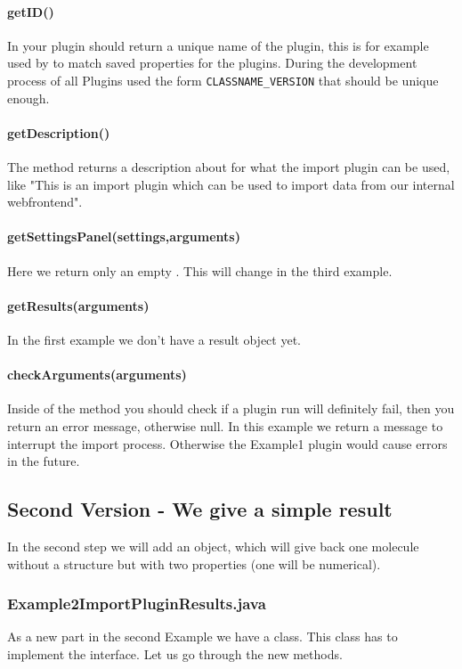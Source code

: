\paragraph{getID()}
In  your plugin should return a unique name of the plugin, this is for example used by \sh to match saved properties for the plugins. During the development process of \sh all Plugins used the form      \verb+CLASSNAME_VERSION+ that should be unique enough.

\paragraph{getDescription()}
The  method returns a description about for what the import plugin can be used, like "This is an import plugin which can be used to import data from our internal webfrontend".

\paragraph{getSettingsPanel(settings,arguments)}
Here we return only an empty . This will change in the third example.

\paragraph{getResults(arguments)}
In the first example we don't have a result object yet.

\paragraph{checkArguments(arguments)}
Inside of the  method you should check if a plugin run will definitely fail, then you return an error message, otherwise null. In this example we return a message to interrupt the import process. Otherwise the Example1 plugin would cause errors in the future.


\subsection{Second Version - We give a simple result}
In the second step we will add an  object, which will give back one molecule without a structure but with two properties (one will be numerical).

\subsubsection{Example2ImportPluginResults.java}
As a new part in the second Example we have a  class. This class has to implement the  interface. Let us go through the new methods.

